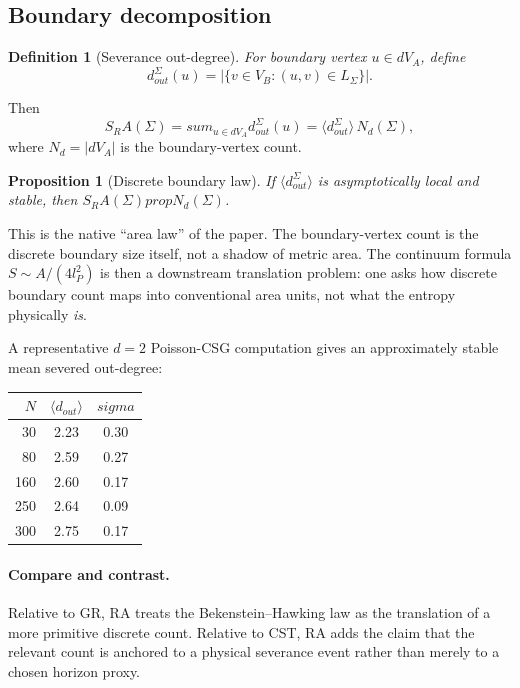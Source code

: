 \documentclass[11pt]{article}
\def\ell{l}%
\def\sigma{sigma}%
\def\mathrm#1{#1}%
\def\sum{sum}%
\def\partial{d}%
\def\propto{prop}%
\def\SRa{S_RA}%
\newtheorem{definition}{Definition}
\newtheorem{proposition}{Proposition}
\newcommand{\SRa}{\ensuremath{S_{\mathrm{RA}}}}
\begin{document}
\subsection{Boundary decomposition}

\begin{definition}[Severance out-degree]
For boundary vertex $u\in\partial V_A$, define
\[
d_{\mathrm{out}}^\Sigma(u)=|\{v\in V_B:(u,v)\in L_\Sigma\}|.
\]
\end{definition}

Then
\begin{equation}
\label{eq:decomposition}
\SRa(\Sigma)=\sum_{u\in\partial V_A}d_{\mathrm{out}}^\Sigma(u)=\langle d_{\mathrm{out}}^\Sigma\rangle\,N_\partial(\Sigma),
\end{equation}
where $N_\partial=|\partial V_A|$ is the boundary-vertex count.

\begin{proposition}[Discrete boundary law]
If $\langle d_{\mathrm{out}}^\Sigma\rangle$ is asymptotically local and stable, then $\SRa(\Sigma)\propto N_\partial(\Sigma)$.
\end{proposition}

This is the native ``area law'' of the paper. The boundary-vertex count is the discrete boundary size itself, not a shadow of metric area. The continuum formula $S\sim A/(4\ell_P^2)$ is then a downstream translation problem: one asks how discrete boundary count maps into conventional area units, not what the entropy physically \emph{is}.

A representative $d=2$ Poisson-CSG computation gives an approximately stable mean severed out-degree:

\begin{center}
\begin{tabular}{rcc}
\toprule
$N$ & $\langle d_{\mathrm{out}}\rangle$ & $\sigma$ \\
\midrule
30 & 2.23 & 0.30 \\
80 & 2.59 & 0.27 \\
160 & 2.60 & 0.17 \\
250 & 2.64 & 0.09 \\
300 & 2.75 & 0.17 \\
\bottomrule
\end{tabular}
\end{center}

\paragraph{Compare and contrast.} Relative to GR, RA treats the Bekenstein--Hawking law as the translation of a more primitive discrete count. Relative to CST, RA adds the claim that the relevant count is anchored to a physical severance event rather than merely to a chosen horizon proxy.
\end{document}
